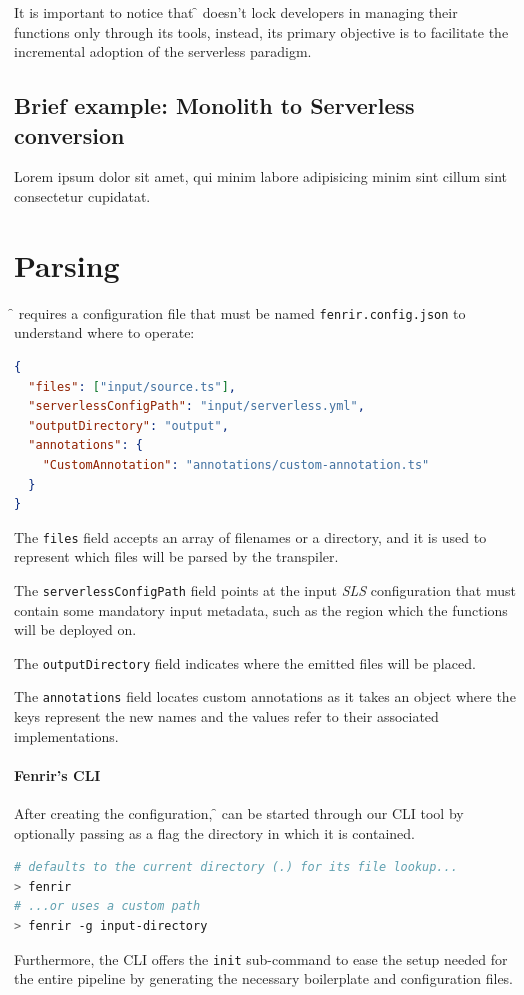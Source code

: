 It is important to notice that \f{} doesn't lock developers in managing their
functions only through its tools, instead, its primary objective is to facilitate
the incremental adoption of the serverless paradigm.

\subsection{Brief example: Monolith to Serverless conversion}

Lorem ipsum dolor sit amet, qui minim labore adipisicing minim sint cillum sint consectetur cupidatat.



\section{Parsing}

\f{} requires a configuration file that must be named \verb|fenrir.config.json| to understand where to operate:

\begin{lstlisting}[language=json]
{
  "files": ["input/source.ts"],
  "serverlessConfigPath": "input/serverless.yml",
  "outputDirectory": "output",
  "annotations": {
    "CustomAnnotation": "annotations/custom-annotation.ts"
  }
}
\end{lstlisting}

The \verb|files| field accepts an array of filenames or a directory,
and it is used to represent which files will be parsed by the transpiler.

The \verb|serverlessConfigPath| field points at the input \textit{SLS} configuration
that must contain some mandatory input metadata, such as the region which the functions will be deployed on.

The \verb|outputDirectory| field indicates where the emitted files will be placed.

The \verb|annotations| field locates custom annotations as it takes an object
where the keys represent the new names and the values refer to their associated implementations.

\paragraph{\textbf{Fenrir's CLI}}
After creating the configuration, \f{} can be started through our CLI tool
by optionally passing as a flag the directory in which it is contained.
\begin{lstlisting}[language=bash, style=bashstyle]
# defaults to the current directory (.) for its file lookup...
> fenrir
# ...or uses a custom path
> fenrir -g input-directory
\end{lstlisting}
Furthermore, the CLI offers the \verb|init| sub-command to ease the setup needed for the entire pipeline
by generating the necessary boilerplate and configuration files.


